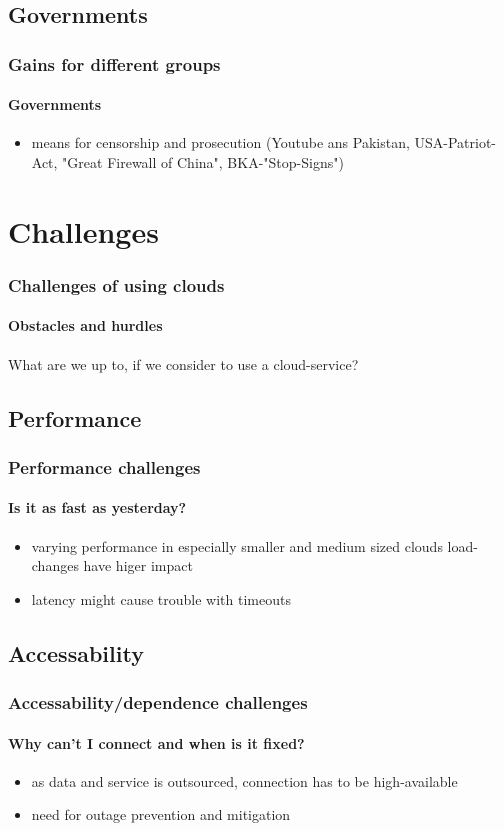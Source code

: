 \documentclass[]{beamer}
\begin{document}
\subsection{Governments}

\begin{frame}
        \frametitle{Gains for different groups}
        \framesubtitle{Governments}
        \begin{itemize}
                \item means for censorship and prosecution (Youtube ans
                Pakistan, USA-Patriot-Act, "Great Firewall of China",
                BKA-"Stop-Signs")
        \end{itemize}
\end{frame}

\section{Challenges}

\begin{frame}
        \frametitle{Challenges of using clouds}
        \framesubtitle{Obstacles and hurdles}
        What are we up to, if we consider to use a cloud-service?
\end{frame}

\subsection{Performance}

\begin{frame}
        \frametitle{Performance challenges}
        \framesubtitle{Is it as fast as yesterday?}
        \begin{itemize}
                \item varying performance in especially smaller and medium sized
                clouds {load-changes have higer impact}
                \item latency might cause trouble with timeouts
        \end{itemize}
\end{frame}

\subsection{Accessability}

\begin{frame}
        \frametitle{Accessability/dependence challenges}
        \framesubtitle{Why can't I connect and when is it fixed?}
        \begin{itemize}
                \item as data and service is outsourced, connection has to be
                high-available
                \item need for outage prevention and mitigation
        \end{itemize}
\end{frame}
\end{document}
